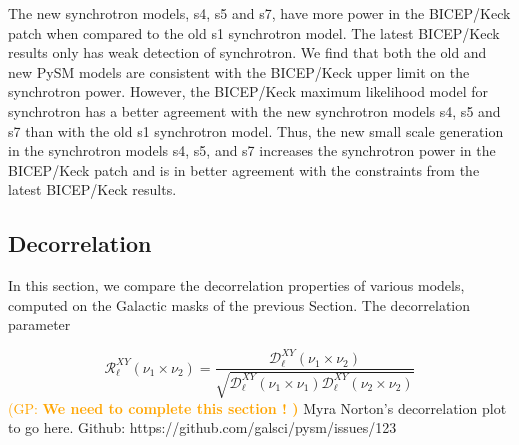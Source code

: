 \documentclass[twocolumn]{aastex631}
\newcommand{\giuse}[1]{\textcolor{orange}{(GP: #1)}}
\begin{document}

The new synchrotron models, s4, s5 and s7, have more power in the BICEP/Keck patch when compared to the old s1 synchrotron model. The latest BICEP/Keck results only has weak detection of synchrotron. We find that both the old and new PySM models are consistent with the BICEP/Keck upper limit on the synchrotron power. However, the BICEP/Keck maximum likelihood model for synchrotron has a better agreement with the new synchrotron models s4, s5 and s7 than with the old s1 synchrotron model. Thus, the new small scale generation in the synchrotron models s4, s5, and s7 increases the synchrotron power in the BICEP/Keck patch and is in better agreement with the constraints from the latest BICEP/Keck results.

\subsection{Decorrelation}

In this section, we compare the decorrelation properties of various models, computed on the Galactic masks of the previous Section. The decorrelation parameter

\begin{equation}
    \mathcal{R}^{XY}_\ell(\nu_1\times\nu_2) = \frac{\mathcal{D}_\ell^{XY}(\nu_1\times\nu_2)}{\sqrt{\mathcal{D}_\ell^{XY}(\nu_1\times\nu_1)\mathcal{D}_\ell^{XY}(\nu_2\times\nu_2)}}
\end{equation}
\giuse{\bf We need to complete this section !  }
Myra Norton's decorrelation plot to go here. Github: https://github.com/galsci/pysm/issues/123
\end{document}
